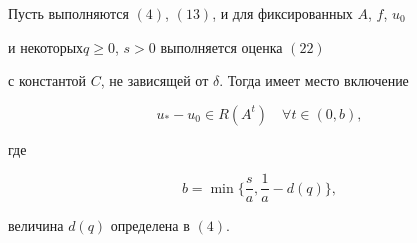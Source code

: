 \begin{thm} 


Пусть выполняются $(4)$, $(13)$, и для фиксированных $A$, $f$, $u_0$ 


и некоторых\linebreak $q\ge0$, $s>0$ выполняется оценка $(22)$ 


с константой $C$, не зависящей от $\delta$. Тогда имеет место включение 


\begin{equation} 


u_*-u_0\in R(A^t)\quad \forall t\in(0,b), 


\end{equation} 


где 


\begin{equation} 


b=\min\bigg\{\frac{s}{a},\frac{1}{a}-d(q)\bigg\}, 


\end{equation} 


величина $d(q)$ определена в $(4)$. 


\end{thm} 


 



